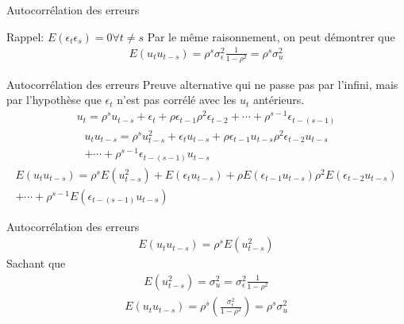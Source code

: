\documentclass{beamer}
\begin{document}
\begin{frame}{Autocorrélation des erreurs}
\begin{block}{Rappel: $E(\epsilon_t \epsilon_s)=0 \forall t \neq s$}
Par le même raisonnement, on peut démontrer que
\begin{align*}
E(u_tu_{t-s})=\rho^s\sigma_{\epsilon}^2\frac{1}{1-\rho^2}=\rho^s\sigma_u^2
\end{align*}
\end{block}

\end{frame}

\begin{frame}{Autocorrélation des erreurs}
Preuve alternative qui ne passe pas par l’infini, mais par l’hypothèse que $\epsilon_t$ n’est pas corrélé avec les $u_t$ antérieurs.
\begin{align*}
u_t=\rho^s u_{t-s} +\epsilon_{t}+\rho \epsilon_{t-1} \rho^2 \epsilon_{t-2}+ \cdots+ \rho^{s-1} \epsilon_{t-(s-1)}
\end{align*}
\begin{align*}
u_tu_{t-s}=\rho^s u_{t-s}^2 +\epsilon_{t}u_{t-s}+\rho \epsilon_{t-1}u_{t-s} \rho^2 \epsilon_{t-2}u_{t-s} \\ + \cdots+ \rho^{s-1} \epsilon_{t-(s-1)}u_{t-s}
\end{align*}
\begin{align*}
E(u_tu_{t-s})=\rho^s E(u_{t-s}^2) +E(\epsilon_{t}u_{t-s})+\rho E(\epsilon_{t-1}u_{t-s}) \rho^2 E(\epsilon_{t-2}u_{t-s}) \\ + \cdots+ \rho^{s-1} E(\epsilon_{t-(s-1)}u_{t-s})
\end{align*}

\end{frame}

\begin{frame}{Autocorrélation des erreurs}
\begin{align*}
E(u_tu_{t-s})=\rho^s E(u_{t-s}^2)
\end{align*}
Sachant que 
\begin{align*}
E(u_{t-s}^2)=\sigma_u^2= \sigma_{\epsilon}^2 \frac{1}{1-\rho^2}
\end{align*}
\begin{align*}
E(u_tu_{t-s})= \rho^s \left( \frac{\sigma_{\epsilon}^2}{1-\rho^2} \right)= \rho^s \sigma_u^2
\end{align*}
\end{frame}
\end{document}
